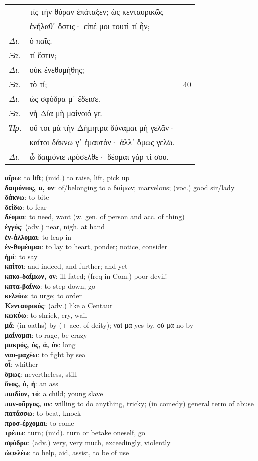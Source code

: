 \documentclass[13pt]{article}
\newcommand{\vocabentry}[2]{\textbf{#1}: #2\vspace{0.0em}\\}
\begin{document}
\begin{greek}
\begin{spacing}{1.5}
\noindent\textit{\MakeUppercase{}}

\begin{tabularx}{\textwidth}{@{}lXr@{}}
  & τίς τὴν θύραν ἐπάταξεν; ὡς κενταυρικῶς & \\
  & ἐνήλαθ᾽ ὅστις· εἰπέ μοι τουτὶ τί ἦν; & \\
  \textit{Δι.} & ὁ παῖς. & \\
  \textit{Ξα.} & \hspace*{3em}τί ἔστιν; & \\
  \textit{Δι.} & \hspace*{6.5em}οὐκ ἐνεθυμήθης; & \\
  \textit{Ξα.} & \hspace*{13.5em}τὸ τί; & 40 \\
  \textit{Δι.} & ὡς σφόδρα μ᾽ ἔδεισε. & \\
  \textit{Ξα.} & \hspace*{8.5em}νὴ Δία μὴ μαίνοιό γε. & \\
  \textit{Ἡρ.} & οὔ τοι μὰ τὴν Δήμητρα δύναμαι μὴ γελᾶν· & \\
  & καίτοι δάκνω γ᾽ ἐμαυτόν· ἀλλ᾽ ὅμως γελῶ. & \\
  \textit{Δι.} & ὦ δαιμόνιε πρόσελθε· δέομαι γάρ τί σου. & \\
\end{tabularx}

\end{spacing}

\newpage

\begin{multicols}{2}
\small %
\vocabentry{αἴρω}{to lift; (mid.) to raise, lift, pick up}
\vocabentry{δαιμόνιος, α, ον}{of/belonging to a δαίμων; marvelous; (voc.) good sir/lady}
\vocabentry{δάκνω}{to bite}
\vocabentry{δείδω}{to fear}
\vocabentry{δέομαι}{to need, want (w. gen. of person and acc. of thing)}
\vocabentry{ἐγγύς}{(adv.) near, nigh, at hand}
\vocabentry{ἐν-άλλομαι}{to leap in}
\vocabentry{ἐν-θυμέομαι}{to lay to heart, ponder; notice, consider}
\vocabentry{ἠμί}{to say}
\vocabentry{καίτοι}{and indeed, and further; and yet}
\vocabentry{κακο-δαίμων, ον}{ill-fated; (freq in Com.) poor devil!}
\vocabentry{κατα-βαίνω}{to step down, go}
\vocabentry{κελεύω}{to urge; to order}
\vocabentry{Κενταυρικός}{(adv.) like a Centaur}
\vocabentry{κωκύω}{to shriek, cry, wail}
\vocabentry{μά}{(in oaths) by (+ acc. of deity); ναὶ μὰ yes by, οὐ μὰ no by}
\vocabentry{μαίνομαι}{to rage, be crazy}
\vocabentry{μακρός, ός, ά, όν}{long}
\vocabentry{ναυ-μαχέω}{to fight by sea}
\vocabentry{οἷ}{whither}
\vocabentry{ὅμως}{nevertheless, still}
\vocabentry{ὄνος, ὁ, ἡ}{an ass}
\vocabentry{παιδίον, τό}{a child; young slave}
\vocabentry{παν-οῦργος, ον}{willing to do anything, tricky; (in comedy) general term of abuse}
\vocabentry{πατάσσω}{to beat, knock}
\vocabentry{προσ-έρχομαι}{to come}
\vocabentry{τρέπω}{turn; (mid). turn or betake oneself, go}
\vocabentry{σφόδρα}{(adv.) very, very much, exceedingly, violently}
\vocabentry{ὠφελέω}{to help, aid, assist, to be of use}
\end{multicols}


\end{greek}
\end{document}
